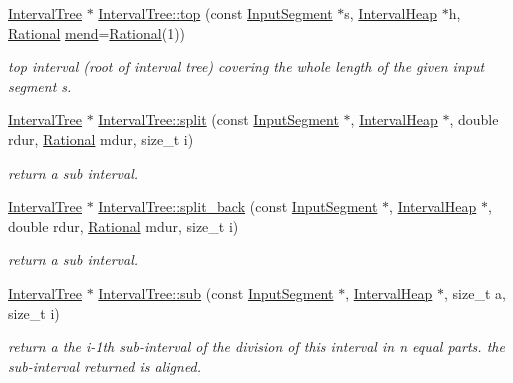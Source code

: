 \begin{DoxyCompactItemize}
\mbox{\hyperlink{classIntervalTree}{Interval\+Tree}} $\ast$ \mbox{\hyperlink{group__segment_ga0c04840a0d05d3b0d4b99e654d72b81b}{Interval\+Tree\+::top}} (const \mbox{\hyperlink{classInputSegment}{Input\+Segment}} $\ast$s, \mbox{\hyperlink{classIntervalHeap}{Interval\+Heap}} $\ast$h, \mbox{\hyperlink{classRational}{Rational}} \mbox{\hyperlink{classInterval_a963b9b36f085a7db9c159c55608f8408}{mend}}=\mbox{\hyperlink{classRational}{Rational}}(1))
\begin{DoxyCompactList}\small\item\em top interval (root of interval tree) covering the whole length of the given input segment s. \end{DoxyCompactList}\item 
\mbox{\hyperlink{classIntervalTree}{Interval\+Tree}} $\ast$ \mbox{\hyperlink{group__segment_gae9e8f6ca3fa4093cfcd1428e9f41d048}{Interval\+Tree\+::split}} (const \mbox{\hyperlink{classInputSegment}{Input\+Segment}} $\ast$, \mbox{\hyperlink{classIntervalHeap}{Interval\+Heap}} $\ast$, double rdur, \mbox{\hyperlink{classRational}{Rational}} mdur, size\+\_\+t i)
\begin{DoxyCompactList}\small\item\em return a sub interval. \end{DoxyCompactList}\item 
\mbox{\hyperlink{classIntervalTree}{Interval\+Tree}} $\ast$ \mbox{\hyperlink{group__segment_ga5b1393db865d0dd81249033dd99ecd5c}{Interval\+Tree\+::split\+\_\+back}} (const \mbox{\hyperlink{classInputSegment}{Input\+Segment}} $\ast$, \mbox{\hyperlink{classIntervalHeap}{Interval\+Heap}} $\ast$, double rdur, \mbox{\hyperlink{classRational}{Rational}} mdur, size\+\_\+t i)
\begin{DoxyCompactList}\small\item\em return a sub interval. \end{DoxyCompactList}\item 
\mbox{\hyperlink{classIntervalTree}{Interval\+Tree}} $\ast$ \mbox{\hyperlink{group__segment_gacb8de7e3756951950c391d241adec21c}{Interval\+Tree\+::sub}} (const \mbox{\hyperlink{classInputSegment}{Input\+Segment}} $\ast$, \mbox{\hyperlink{classIntervalHeap}{Interval\+Heap}} $\ast$, size\+\_\+t a, size\+\_\+t i)
\begin{DoxyCompactList}\small\item\em return a the i-\/1th sub-\/interval of the division of this interval in n equal parts. the sub-\/interval returned is aligned. \end{DoxyCompactList}\item 

\end{DoxyCompactItemize}
